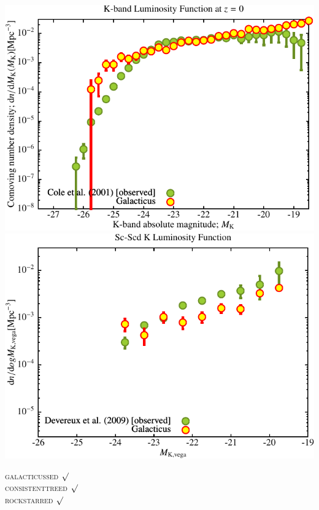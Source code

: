 \includegraphics[scale=0.6]{stages14_ling/Plot_K_Luminosity_Function.pdf} \\
\includegraphics[scale=0.6]{stages14_ling/Plot_Morphological_Luminosity_Function6.pdf}



\textsc{galacticussed} $\surd$ \\
\textsc{consistenttreed} $\surd$ \\ 
\textsc{rockstarred} $\surd$
% 
%
%
%
%
%
%
%

